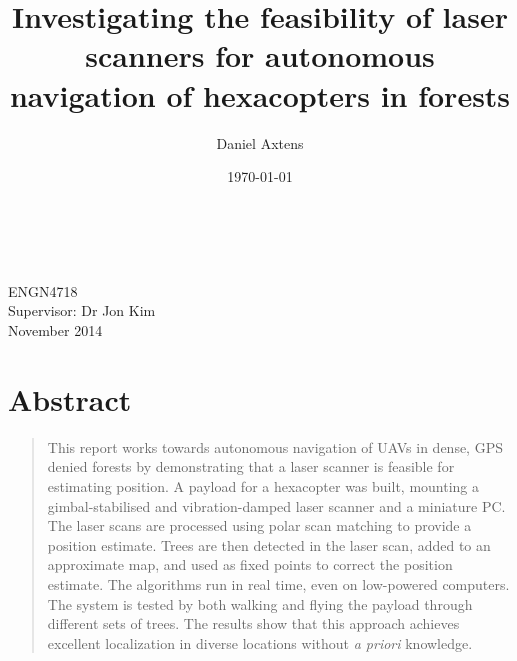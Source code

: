 \documentclass[12pt,oneside,a4paper]{book}
\title{Investigating the feasibility of laser scanners for autonomous
  navigation of hexacopters in forests}
\author{Daniel Axtens}
\date{\today}
\begin{document}
\pagestyle{empty}
\thispagestyle{empty}

\begin{titlepage}
  \enlargethispage{2cm}
  \begin{center}
    \makeatletter
    \Huge\textbf{\@title} \\[2.9cm]
    \huge\textbf{\@author} \\[10.5cm]
    \makeatother
    \LARGE ENGN4718\\
    Supervisor: Dr Jon Kim\\[2cm]
    November 2014
  \end{center}
\end{titlepage}


%

%

%

\cleardoublepage
\pagestyle{headings}
%

\section*{\centering Abstract}
\label{sec:abstract}

\begin{quote}
  This report works towards autonomous navigation of \glspl{UAV} in
  dense, GPS denied forests by demonstrating that a laser scanner is
  feasible for estimating position. A payload for a hexacopter was
  built, mounting a gimbal-stabilised and vibration-damped laser
  scanner and a miniature PC. The laser scans are processed using
  polar scan matching to provide a position estimate. Trees are then
  detected in the laser scan, added to an approximate map, and used as
  fixed points to correct the position estimate. The algorithms run in
  real time, even on low-powered computers. The system is tested by
  both walking and flying the payload through different sets of
  trees. The results show that this approach achieves excellent
  localization in diverse locations without \emph{a priori} knowledge.
\end{quote}
\end{document}

